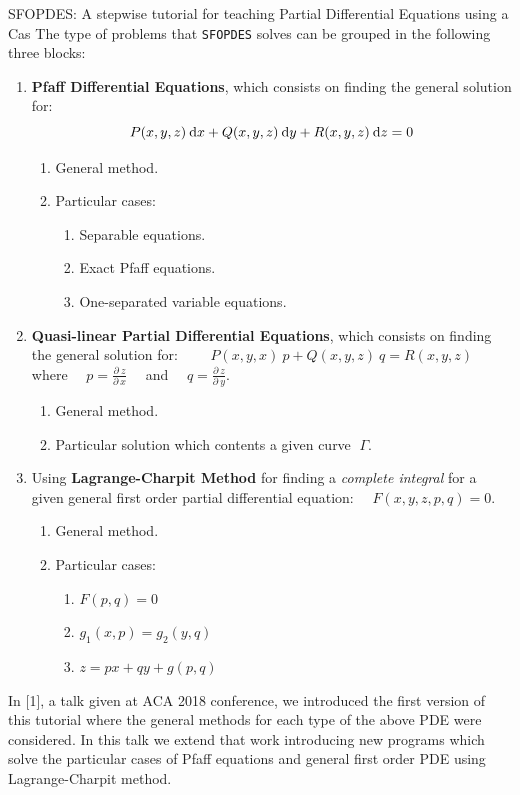 \begin{abstract_online}{SFOPDES: A stepwise tutorial for teaching Partial Differential Equations using a {\sc Cas}}
The type of problems that {\tt SFOPDES} solves can be grouped in the following three blocks:
\begin{enumerate}
\item {\bf Pfaff Differential Equations}, which consists on finding the general solution for:
$$
P(x,y,z)\:{\rm d}x + Q(x,y,z)\:{\rm d}y + R(x,y,z)\:{\rm d}z = 0
$$
\begin{enumerate}
\item General method.
\item Particular cases:
\begin{enumerate}\item Separable equations.
\item Exact Pfaff equations.
\item One-separated variable equations.
\end{enumerate}
\end{enumerate}
\item {\bf Quasi-linear Partial Differential Equations}, which consists on finding the general solution for:
$\qquad\displaystyle
P(x,y,x)\:p + Q(x,y,z)\:q = R(x,y,z)
\qquad$
where $\displaystyle \quad p=\frac{\partial\: z}{\partial\: x}\quad$ and $\displaystyle \quad q=\frac{\partial\: z}{\partial\: y}$.
\begin{enumerate}
\item General method.
\item Particular solution which contents a given curve $\;\Gamma$. 
\end{enumerate}
\item Using {\bf Lagrange-Charpit Method} for finding a {\em complete integral} for a given general first order partial differential equation: $\quad F(x,y,z,p,q)=0$.
\begin{enumerate}
\item General method.
\item Particular cases: 
\begin{enumerate}
\item $F(p,q)=0$
\item $g_1(x,p) = g_2(y,q)$
\item $z=px+qy+g(p,q)$
\end{enumerate}
\end{enumerate}
\end{enumerate}
In [1], a talk given at ACA 2018 conference, we introduced the first version of this tutorial where the general methods for each type of the above PDE were considered. In this talk we extend that work introducing new programs which solve the particular cases of Pfaff equations and general first order PDE using Lagrange-Charpit method.


\end{abstract_online}
